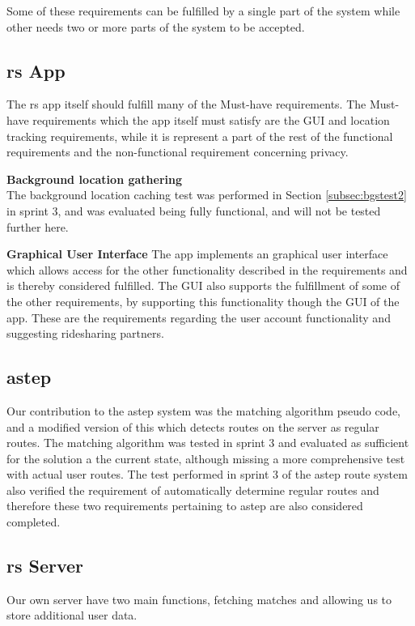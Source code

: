 Some of these requirements can be fulfilled by a single part of the system while other needs two or more parts of the system to be accepted.

\subsection{\gls{rs} App}
The \gls{rs} app itself should fulfill many of the Must-have requirements.
The Must-have requirements which the app itself must satisfy are the GUI and location tracking requirements, while it is represent a part of the rest of the functional requirements and the non-functional requirement concerning privacy.

\textbf{Background location gathering}\\
The background location caching test was performed in Section \ref{subsec:bgstest2} in sprint 3, and was evaluated being fully functional, and will not be tested further here.

\textbf{Graphical User Interface}
The app implements an graphical user interface which allows access for the other functionality described in the requirements and is thereby considered fulfilled.
The GUI also supports the fulfillment of some of the other requirements, by supporting this functionality though the GUI of the app.
These are the requirements regarding the user account functionality and suggesting ridesharing partners.

\subsection{\gls{astep}}
Our contribution to the \gls{astep} system was the matching algorithm pseudo code, and a modified version of this which detects routes on the server as regular routes.
The matching algorithm was tested in sprint 3 and evaluated as sufficient for the solution a the current state, although missing a more comprehensive test with actual user routes.
The test performed in sprint 3 of the \gls{astep} route system also verified the requirement of automatically determine regular routes and therefore these two requirements pertaining to \gls{astep} are also considered completed.

\subsection{\gls{rs} Server}
Our own server have two main functions, fetching matches and allowing us to store additional user data.

